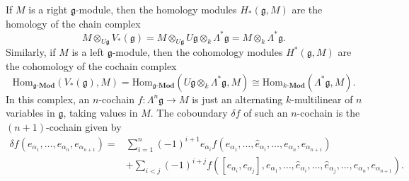 \begin{corollary}
  \label{cor:cohom}
  If $ M $ is a right $ \mathfrak{g} $-module, then the homology modules $ H_*(\mathfrak{g}, M) $ are the homology of the chain complex
  \begin{equation}
    M \otimes_{U\mathfrak{g}} V_{*}(\mathfrak{g}) = M \otimes_{U\mathfrak{g}} U\mathfrak{g} \otimes_k \Lambda^{*}\mathfrak{g} = M \otimes_k \Lambda^{*}\mathfrak{g}.
  \end{equation}
  Similarly, if $ M $ is a left $ \mathfrak{g} $-module, then the cohomology modules $ H^{*}(\mathfrak{g}, M) $ are the cohomology of the cochain complex
  \begin{equation}
    \text{Hom}_{\mathfrak{g}\text{-}\mathbf{Mod}}(V_*(\mathfrak{g}), M) = \text{Hom}_{\mathfrak{g}\text{-}\mathbf{Mod}}(U\mathfrak{g} \otimes_k \Lambda^{*}\mathfrak{g}, M) \cong \text{Hom}_{k\text{-}\mathbf{Mod}}(\Lambda^{*}\mathfrak{g}, M).
  \end{equation}
  In this complex, an $ n $-cochain $ f: \Lambda^{n}\mathfrak{g} \to M $ is just an alternating $ k $-multilinear of $ n $ variables in $ \mathfrak{g} $, taking values in $ M $. The coboundary $ \delta f $ of such an $ n $-cochain is the $ (n +1) $-cochain given by
  \begin{align*}
    \delta f(e_{\alpha_1}, \ldots, e_{\alpha_n}, e_{\alpha_{n + 1}}) = &\sum_{i = 1}^{n} (-1)^{i + 1} e_{\alpha_i}f(e_{\alpha_1}, \ldots, \widehat{e}_{\alpha_i}, \ldots, e_{\alpha_n}, e_{\alpha_{n + 1}}) \\
                                                                       &+ \sum_{i < j} (-1)^{i + j} f \left( [e_{\alpha_i}, e_{\alpha_{j}}], e_{\alpha_1}, \ldots, \widehat{e}_{\alpha_i}, \ldots, \widehat{e}_{\alpha_j}, \ldots, e_{\alpha_n}, e_{\alpha_{n + 1}} \right).
  \end{align*}
\end{corollary}

